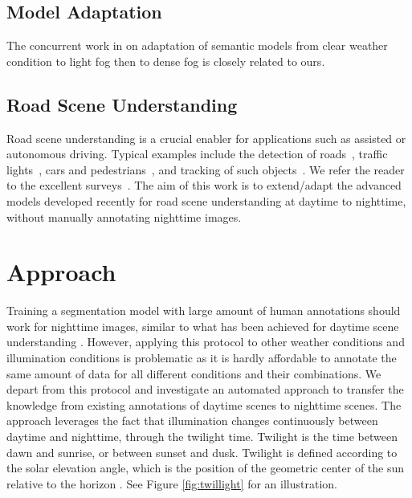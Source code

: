 \documentclass[letterpaper, 10 pt, conference]{ieeeconf}
\begin{document}
\subsection{Model Adaptation}
  The concurrent work in \cite{SynRealDataFogECCV18} on adaptation of semantic
models from clear weather condition to light fog then to dense fog is closely related to ours.



\subsection{Road Scene Understanding}
Road scene understanding is a crucial enabler for applications such as assisted or autonomous driving. Typical examples include the detection of roads~\cite{recent:progress:lane}, traffic lights~\cite{traffic:light:survey:16}, cars and pedestrians~\cite{Cityscapes,semantic:foggy:scene}, and tracking of such objects~\cite{vehicles:road:survey:13,pathtrack}. We refer the reader to the excellent surveys~\cite{looking:at:human}. The aim of this work is to extend/adapt the advanced models developed recently for road scene understanding at daytime to nighttime, without manually annotating nighttime images. 

\section{Approach} 
\label{sec:approach}
Training a segmentation model with large amount of human annotations should work for nighttime images, similar to what has been achieved for daytime scene understanding \cite{MastRCNN,refinenet}. However, applying this protocol to other weather conditions and illumination conditions is problematic as it is hardly affordable to annotate the same amount of data for all different conditions and their combinations. We depart from this protocol and investigate an automated approach to transfer the knowledge from existing annotations of daytime scenes to nighttime scenes. The approach leverages the fact that illumination changes continuously between daytime and nighttime, through the twilight time. Twilight is the time between dawn and sunrise, or between sunset and dusk. Twilight is defined according to the solar elevation angle, which is the position of the geometric center of the sun relative to the horizon \cite{twilight:definition}.  See Figure \ref{fig:twillight} for an illustration.   
\end{document}
